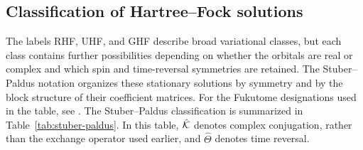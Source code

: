 \documentclass[11pt,a4paper,titlepage]{article}
\numberwithin{equation}{section}
\newcommand{\chK}{\Hat{\mathcal{K}}}
\begin{document}
\subsection{Classification of Hartree--Fock solutions}

The labels RHF, UHF, and GHF describe broad variational classes, but each class
contains further possibilities depending on whether the orbitals are real or
complex and which spin and time-reversal symmetries are retained. The
Stuber--Paldus notation \citep{StuberPaldus2003} organizes these stationary solutions by symmetry and
by the block structure of their coefficient matrices.
For the Fukutome designations used in the table, see \citet{Fukutome1981}.
The Stuber--Paldus classification is summarized in
Table~\ref{tab:stuber-paldus}. In this table, $\chK$ denotes complex
conjugation, rather than the exchange operator used earlier, and
$\hat\Theta$ denotes time reversal.
\hfBioPaldus
\end{document}
